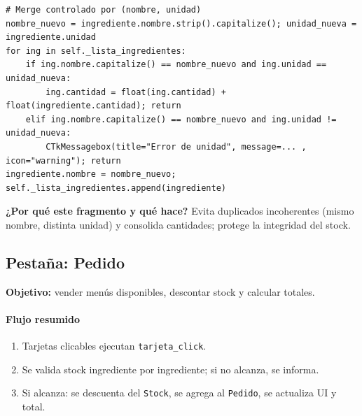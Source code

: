 \documentclass[12pt,a4paper]{article}
\begin{document}
\begin{tcolorbox}[colback=green!6,colframe=green!60!black,title=Highlight de código — Stock (\texttt{agregar\_ingrediente})]
\lstset{style=pyclean}
\begin{lstlisting}
# Merge controlado por (nombre, unidad)
nombre_nuevo = ingrediente.nombre.strip().capitalize(); unidad_nueva = ingrediente.unidad
for ing in self._lista_ingredientes:
    if ing.nombre.capitalize() == nombre_nuevo and ing.unidad == unidad_nueva:
        ing.cantidad = float(ing.cantidad) + float(ingrediente.cantidad); return
    elif ing.nombre.capitalize() == nombre_nuevo and ing.unidad != unidad_nueva:
        CTkMessagebox(title="Error de unidad", message=... , icon="warning"); return
ingrediente.nombre = nombre_nuevo; self._lista_ingredientes.append(ingrediente)
\end{lstlisting}
\textbf{¿Por qué este fragmento y qué hace?} Evita duplicados incoherentes (mismo nombre, distinta unidad) y consolida cantidades; protege la integridad del stock.
\end{tcolorbox}
\newpage

\subsection{Pestaña: Pedido}
\textbf{Objetivo:} vender menús disponibles, descontar stock y calcular totales.

\paragraph{Flujo resumido}
\begin{enumerate}[leftmargin=*]
  \item Tarjetas clicables ejecutan \texttt{tarjeta\_click}.
  \item Se valida stock ingrediente por ingrediente; si no alcanza, se informa.
  \item Si alcanza: se descuenta del \texttt{Stock}, se agrega al \texttt{Pedido}, se actualiza UI y total.
\end{enumerate}
\end{document}

